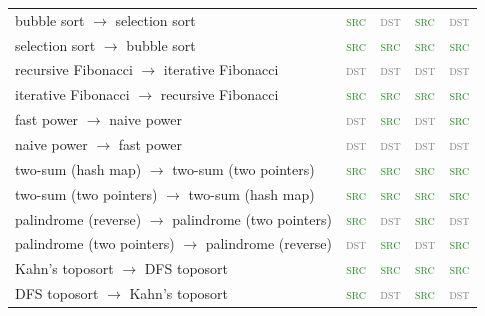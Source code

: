 \begin{table}[h!]
\begin{tabular}{lcccc}
bubble sort $\to$ selection sort & \textcolor{ForestGreen}{\textsc{src}} & \textcolor{gray}{\textsc{dst}} & \textcolor{ForestGreen}{\textsc{src}} & \textcolor{gray}{\textsc{dst}} \\
selection sort $\to$ bubble sort & \textcolor{ForestGreen}{\textsc{src}} & \textcolor{ForestGreen}{\textsc{src}} & \textcolor{ForestGreen}{\textsc{src}} & \textcolor{ForestGreen}{\textsc{src}} \\
recursive Fibonacci $\to$ iterative Fibonacci & \textcolor{gray}{\textsc{dst}} & \textcolor{gray}{\textsc{dst}} & \textcolor{gray}{\textsc{dst}} & \textcolor{gray}{\textsc{dst}} \\
iterative Fibonacci $\to$ recursive Fibonacci & \textcolor{ForestGreen}{\textsc{src}} & \textcolor{ForestGreen}{\textsc{src}} & \textcolor{ForestGreen}{\textsc{src}} & \textcolor{ForestGreen}{\textsc{src}} \\
fast power $\to$ naive power & \textcolor{gray}{\textsc{dst}} & \textcolor{ForestGreen}{\textsc{src}} & \textcolor{gray}{\textsc{dst}} & \textcolor{ForestGreen}{\textsc{src}} \\
naive power $\to$ fast power & \textcolor{gray}{\textsc{dst}} & \textcolor{gray}{\textsc{dst}} & \textcolor{gray}{\textsc{dst}} & \textcolor{gray}{\textsc{dst}} \\
two-sum (hash map) $\to$ two-sum (two pointers) & \textcolor{ForestGreen}{\textsc{src}} & \textcolor{ForestGreen}{\textsc{src}} & \textcolor{ForestGreen}{\textsc{src}} & \textcolor{ForestGreen}{\textsc{src}} \\
two-sum (two pointers) $\to$ two-sum (hash map) & \textcolor{ForestGreen}{\textsc{src}} & \textcolor{ForestGreen}{\textsc{src}} & \textcolor{ForestGreen}{\textsc{src}} & \textcolor{ForestGreen}{\textsc{src}} \\
palindrome (reverse) $\to$ palindrome (two pointers) & \textcolor{ForestGreen}{\textsc{src}} & \textcolor{gray}{\textsc{dst}} & \textcolor{ForestGreen}{\textsc{src}} & \textcolor{gray}{\textsc{dst}} \\
palindrome (two pointers) $\to$ palindrome (reverse) & \textcolor{gray}{\textsc{dst}} & \textcolor{ForestGreen}{\textsc{src}} & \textcolor{gray}{\textsc{dst}} & \textcolor{ForestGreen}{\textsc{src}} \\
Kahn's toposort $\to$ DFS toposort & \textcolor{ForestGreen}{\textsc{src}} & \textcolor{ForestGreen}{\textsc{src}} & \textcolor{ForestGreen}{\textsc{src}} & \textcolor{ForestGreen}{\textsc{src}} \\
DFS toposort $\to$ Kahn's toposort & \textcolor{ForestGreen}{\textsc{src}} & \textcolor{gray}{\textsc{dst}} & \textcolor{ForestGreen}{\textsc{src}} & \textcolor{gray}{\textsc{dst}} \\

\end{tabular}
\end{table}
